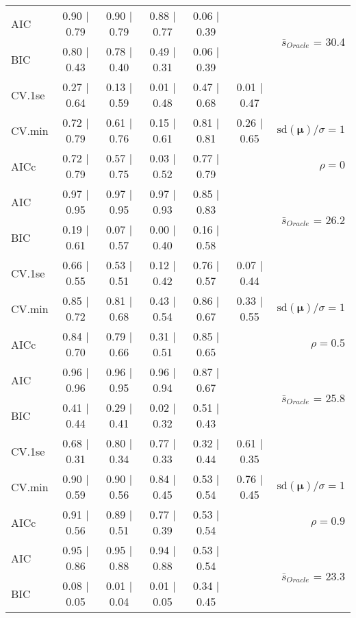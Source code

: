 \begin{table}
\begin{center}
\begin{tabular}{l*{5}{c}|r}
AIC & 0.90 $\mid$ 0.79 & 0.90 $\mid$ 0.79 & 0.88 $\mid$ 0.77 & 0.06 $\mid$ 0.39 & &  \multirow{2}{*}{$\bar{s}_{Oracle}$ = 30.4} \\
BIC & 0.80 $\mid$ 0.43 & 0.78 $\mid$ 0.40 & 0.49 $\mid$ 0.31 & 0.06 $\mid$ 0.39 & &  \\
 \hline 
CV.1se & 0.27 $\mid$ 0.64 & 0.13 $\mid$ 0.59 & 0.01 $\mid$ 0.48 & 0.47 $\mid$ 0.68 & 0.01 $\mid$ 0.47 & \\
CV.min & 0.72 $\mid$ 0.79 & 0.61 $\mid$ 0.76 & 0.15 $\mid$ 0.61 & 0.81 $\mid$ 0.81 & 0.26 $\mid$ 0.65 &  $\mathrm{sd}(\mathbf{\mu})/\sigma=1$ \\
AICc & 0.72 $\mid$ 0.79 & 0.57 $\mid$ 0.75 & 0.03 $\mid$ 0.52 & 0.77 $\mid$ 0.79 & & $\rho=0$ \\
AIC & 0.97 $\mid$ 0.95 & 0.97 $\mid$ 0.95 & 0.97 $\mid$ 0.93 & 0.85 $\mid$ 0.83 & &  \multirow{2}{*}{$\bar{s}_{Oracle}$ = 26.2} \\
BIC & 0.19 $\mid$ 0.61 & 0.07 $\mid$ 0.57 & 0.00 $\mid$ 0.40 & 0.16 $\mid$ 0.58 & &  \\
 \hline 
CV.1se & 0.66 $\mid$ 0.55 & 0.53 $\mid$ 0.51 & 0.12 $\mid$ 0.42 & 0.76 $\mid$ 0.57 & 0.07 $\mid$ 0.44 & \\
CV.min & 0.85 $\mid$ 0.72 & 0.81 $\mid$ 0.68 & 0.43 $\mid$ 0.54 & 0.86 $\mid$ 0.67 & 0.33 $\mid$ 0.55 &  $\mathrm{sd}(\mathbf{\mu})/\sigma=1$ \\
AICc & 0.84 $\mid$ 0.70 & 0.79 $\mid$ 0.66 & 0.31 $\mid$ 0.51 & 0.85 $\mid$ 0.65 & & $\rho=0.5$ \\
AIC & 0.96 $\mid$ 0.96 & 0.96 $\mid$ 0.95 & 0.96 $\mid$ 0.94 & 0.87 $\mid$ 0.67 & &  \multirow{2}{*}{$\bar{s}_{Oracle}$ = 25.8} \\
BIC & 0.41 $\mid$ 0.44 & 0.29 $\mid$ 0.41 & 0.02 $\mid$ 0.32 & 0.51 $\mid$ 0.43 & &  \\
 \hline 
CV.1se & 0.68 $\mid$ 0.31 & 0.80 $\mid$ 0.34 & 0.77 $\mid$ 0.33 & 0.32 $\mid$ 0.44 & 0.61 $\mid$ 0.35 & \\
CV.min & 0.90 $\mid$ 0.59 & 0.90 $\mid$ 0.56 & 0.84 $\mid$ 0.45 & 0.53 $\mid$ 0.54 & 0.76 $\mid$ 0.45 &  $\mathrm{sd}(\mathbf{\mu})/\sigma=1$ \\
AICc & 0.91 $\mid$ 0.56 & 0.89 $\mid$ 0.51 & 0.77 $\mid$ 0.39 & 0.53 $\mid$ 0.54 & & $\rho=0.9$ \\
AIC & 0.95 $\mid$ 0.86 & 0.95 $\mid$ 0.88 & 0.94 $\mid$ 0.88 & 0.53 $\mid$ 0.54 & &  \multirow{2}{*}{$\bar{s}_{Oracle}$ = 23.3} \\
BIC & 0.08 $\mid$ 0.05 & 0.01 $\mid$ 0.04 & 0.01 $\mid$ 0.05 & 0.34 $\mid$ 0.45 & &  \\

\end{tabular}
\end{center}
\end{table}
